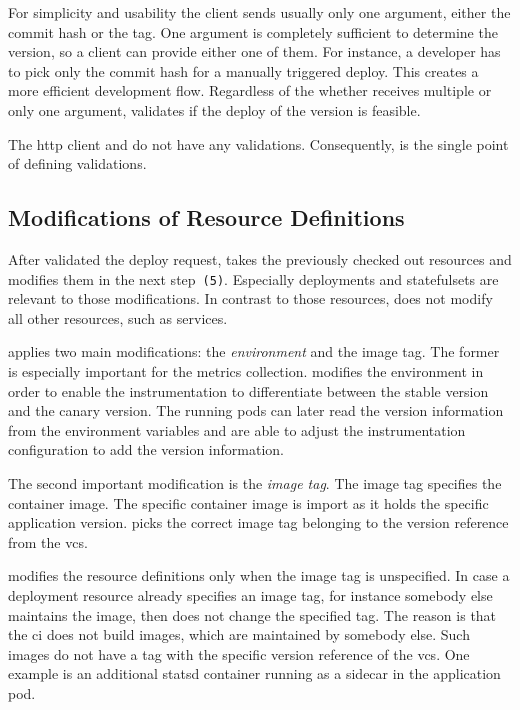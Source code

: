 For simplicity and usability the client sends usually only one argument, either the commit
hash or the tag. One argument is completely sufficient to determine the version, so a
client can provide either one of them. For instance, a developer has to pick only the
commit hash for a manually triggered deploy. This creates a more efficient development
flow. Regardless of the whether \deployer receives multiple or only one argument, \deployer
validates if the deploy of the version is feasible.

The http client and \depctl do not have any validations. Consequently, \deployer is the
single point of defining validations.

\subsection{Modifications of Resource Definitions}

After \deployer validated the deploy request, \deployer takes the previously checked out
resources and modifies them in the next step~\texttt{(5)}. Especially deployments and
statefulsets are relevant to those modifications. In contrast to those resources, \deployer
does not modify all other resources, such as services.

\deployer applies two main modifications: the \emph{environment} and the image tag. The
former is especially important for the metrics collection. \deployer modifies the
environment in order to enable the instrumentation to differentiate between the stable
version and the canary version. The running pods can later read the version information
from the environment variables and are able to adjust the instrumentation configuration to
add the version information.

The second important modification is the \emph{image tag}. The image tag specifies the
container image. The specific container image is import as it holds the specific
application version. \deployer picks the correct image tag belonging to the version
reference from the \gls{vcs}.

\deployer modifies the resource definitions only when the image tag is unspecified. In case
a deployment resource already specifies an image tag, for instance somebody else maintains
the image, then \deployer does not change the specified tag. The reason is that the
\gls{ci} does not build images, which are maintained by somebody else. Such images do not
have a tag with the specific version reference of the \gls{vcs}. One example is an
additional statsd container running as a sidecar in the application pod.

